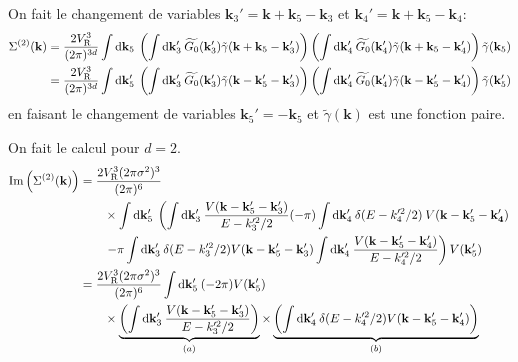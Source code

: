 On fait le changement de variables $\mathbf{k}_{\mathrm{3}}'=\mathbf{k}+\mathbf{k}_{\mathrm{5}}-\mathbf{k}_{\mathrm{3}}$ et $\mathbf{k}_{\mathrm{4}}'=\mathbf{k}+\mathbf{k}_{\mathrm{5}}-\mathbf{k}_{\mathrm{4}}$:
\begin{align}
\Sigma^{(2)}(\mathbf{k})&= \frac{2V_{\mathrm{R}}^3}{(2\pi)^{3d}} \int{\mathop{}\mathopen{}\mathrm{d}\mathbf{k}_{\mathrm{5}} \: \left( \int{\mathop{}\mathopen{}\mathrm{d}\mathbf{k}_{\mathrm{3}}'\: \widetilde{G_0}(\mathbf{k}_{\mathrm{3}}')\tilde{\gamma}(\mathbf{k}+\mathbf{k}_{\mathrm{5}}-\mathbf{k}_{\mathrm{3}}')} \right) \left( \int{\mathop{}\mathopen{}\mathrm{d}\mathbf{k}_{\mathrm{4}}'\: \widetilde{G_0}(\mathbf{k}_{\mathrm{4}}') \tilde{\gamma}(\mathbf{k}+\mathbf{k}_{\mathrm{5}}-\mathbf{k}_{\mathrm{4}}')}\right) \tilde{\gamma}(\mathbf{k}_{\mathrm{5}}) } \\
&= \frac{2V_{\mathrm{R}}^3}{(2\pi)^{3d}} \int{\mathop{}\mathopen{}\mathrm{d}\mathbf{k}_{\mathrm{5}}' \: \left( \int{\mathop{}\mathopen{}\mathrm{d}\mathbf{k}_{\mathrm{3}}'\: \widetilde{G_0}(\mathbf{k}_{\mathrm{3}}')\tilde{\gamma}(\mathbf{k}-\mathbf{k}_{\mathrm{5}}'-\mathbf{k}_{\mathrm{3}}')} \right) \left( \int{\mathop{}\mathopen{}\mathrm{d}\mathbf{k}_{\mathrm{4}}'\: \widetilde{G_0}(\mathbf{k}_{\mathrm{4}}') \tilde{\gamma}(\mathbf{k}-\mathbf{k}_{\mathrm{5}}'-\mathbf{k}_{\mathrm{4}}')}\right) \tilde{\gamma}(\mathbf{k}_{\mathrm{5}}') }
\end{align}
en faisant le changement de variables $\mathbf{k}_{\mathrm{5}}'=-\mathbf{k}_{\mathrm{5}}$ et $\tilde{\gamma}(\mathbf{k}) $ est une fonction paire.

On fait le calcul pour $d=2$.
\begin{align}
\mathrm{Im}\left( \Sigma^{(2)}(\mathbf{k})\right)&= \frac{2V_{\mathrm{R}}^3 (2\pi\sigma^2)^3}{(2\pi)^6} \\
&\nonumber \qquad\times\int{\mathop{}\mathopen{}\mathrm{d}\mathbf{k}_{\mathrm{5}}' \: \left( \int{\mathop{}\mathopen{}\mathrm{d}\mathbf{k}_{\mathrm{3}}' \: \frac{V(\mathbf{k}-\mathbf{k}_{\mathrm{5}}'-\mathbf{k}_{\mathrm{3}}')}{E-k_{\mathrm{3}}'^2/2}} (-\pi) \int{\mathop{}\mathopen{}\mathrm{d}\mathbf{k}_{\mathrm{4}}' \: \delta(E-k_{\mathrm{4}}'^2/2) \: V(\mathbf{k}-\mathbf{k}_{\mathrm{5}}'-\mathbf{k}_{\mathbf{4}}')} \right.} \\
&\nonumber \qquad \left.-\pi\int{\mathop{}\mathopen{}\mathrm{d}\mathbf{k}_{\mathrm{3}}' \: \delta(E-k_{\mathrm{3}}'^2/2) V(\mathbf{k}-\mathbf{k}_{\mathrm{5}}'-\mathbf{k}_{\mathrm{3}}')} \int{\mathop{}\mathopen{}\mathrm{d}\mathbf{k}_{\mathrm{4}}' \: \frac{V(\mathbf{k}-\mathbf{k}_{\mathrm{5}}'-\mathbf{k}_{\mathrm{4}}')}{E-k_{\mathrm{4}}'^2/2}}\right) V(\mathbf{k}_{\mathrm{5}}') \\
&= \frac{2V_{\mathrm{R}}^3 (2\pi\sigma^2)^3}{(2\pi)^6} \int{\mathop{}\mathopen{}\mathrm{d}\mathbf{k}_{\mathrm{5}}' \: (-2\pi) V(\mathbf{k}_{\mathrm{5}}')} \\
&\nonumber\qquad \times\underbrace{\left(\int{\mathop{}\mathopen{}\mathrm{d}\mathbf{k}_{\mathrm{3}}' \:\frac{V(\mathbf{k}-\mathbf{k}_{\mathrm{5}}'-\mathbf{k}_{\mathrm{3}}')}{E-k_{\mathrm{3}}'^2/2}}\right)}_{(a)} \times \underbrace{\left(\int{\mathop{}\mathopen{}\mathrm{d}\mathbf{k}_{\mathrm{4}}'\:\delta(E-k_{\mathrm{4}}'^2/2) V(\mathbf{k}-\mathbf{k}_{\mathrm{5}}'-\mathbf{k}_{\mathrm{4}}')}\right)}_{(b)}
\end{align}

